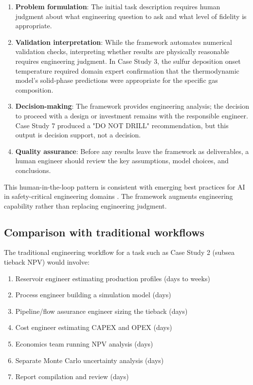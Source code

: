 \documentclass[review,3p]{elsarticle}
\begin{document}
\begin{enumerate}
  \item \textbf{Problem formulation}: The initial task description requires human judgment about what engineering question to ask and what level of fidelity is appropriate.
  \item \textbf{Validation interpretation}: While the framework automates numerical validation checks, interpreting whether results are physically reasonable requires engineering judgment. In Case Study 3, the sulfur deposition onset temperature required domain expert confirmation that the thermodynamic model's solid-phase predictions were appropriate for the specific gas composition.
  \item \textbf{Decision-making}: The framework provides engineering analysis; the decision to proceed with a design or investment remains with the responsible engineer. Case Study 7 produced a "DO NOT DRILL" recommendation, but this output is decision support, not a decision.
  \item \textbf{Quality assurance}: Before any results leave the framework as deliverables, a human engineer should review the key assumptions, model choices, and conclusions.
\end{enumerate}

This human-in-the-loop pattern is consistent with emerging best practices for AI in safety-critical engineering domains \citep{Hughes2025}. The framework augments engineering capability rather than replacing engineering judgment.

\subsection{Comparison with traditional workflows}

The traditional engineering workflow for a task such as Case Study 2 (subsea tieback NPV) would involve:

\begin{enumerate}
  \item Reservoir engineer estimating production profiles (days to weeks)
  \item Process engineer building a simulation model (days)
  \item Pipeline/flow assurance engineer sizing the tieback (days)
  \item Cost engineer estimating CAPEX and OPEX (days)
  \item Economics team running NPV analysis (days)
  \item Separate Monte Carlo uncertainty analysis (days)
  \item Report compilation and review (days)
\end{enumerate}
\end{document}
